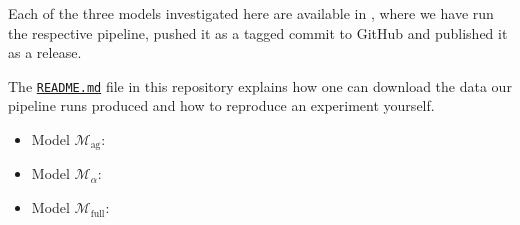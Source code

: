 \begin{tcolorbox}[
    title=\faIcon{recycle} Reproducibility,
    parbox=false,
    float
]
    Each of the three models investigated here are available in , where we have run the respective pipeline, pushed it as a tagged commit to GitHub and published it as a release.

    The \href{https://github.com/rmnldwg/lynference#readme}{ \texttt{README.md}} file in this repository explains how one can download the data our pipeline runs produced and how to reproduce an experiment yourself.

    \begin{itemize}
        \item Model $\mathcal{M}_\text{ag}$: 
        \item Model $\mathcal{M}_\alpha$: 
        \item Model $\mathcal{M}_\text{full}$: 
    \end{itemize}
\end{tcolorbox}
